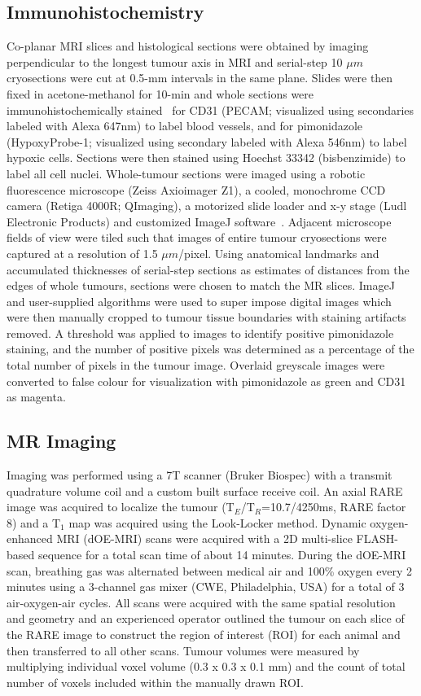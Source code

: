 \subsection{Immunohistochemistry}
Co-planar MRI slices and histological sections were obtained by imaging perpendicular to the longest tumour axis in MRI and serial-step 10 $\mu m$ cryosections were cut at 0.5-mm intervals in the same plane.
Slides were then fixed in acetone-methanol for 10-min and whole sections were immunohistochemically stained~\cite{Kalra:2017is} for CD31 (PECAM; visualized using secondaries labeled with Alexa 647nm) to label blood vessels, and for pimonidazole (HypoxyProbe-1; visualized using secondary labeled with Alexa 546nm) to label hypoxic cells. Sections were then stained using Hoechst 33342 (bisbenzimide) to label all cell nuclei.
Whole-tumour sections were imaged using a robotic fluorescence microscope (Zeiss Axioimager Z1), a cooled, monochrome CCD camera (Retiga 4000R; QImaging), a motorized slide loader and x-y stage (Ludl Electronic Products) and customized ImageJ software~\cite{Collins:2007jr}. 
Adjacent microscope fields of view were tiled such that images of entire tumour cryosections were captured at a resolution of 1.5 $\mu m$/pixel. 
Using anatomical landmarks and accumulated thicknesses of serial-step sections as estimates of distances from the edges of whole tumours, sections were chosen to match the MR slices. 
ImageJ and user-supplied algorithms were used to super impose digital images which were then manually cropped to tumour tissue boundaries with staining artifacts removed. 
A threshold was applied to images to identify positive pimonidazole staining, and the number of positive pixels was determined as a percentage of the total number of pixels in the tumour image. 
Overlaid greyscale images were converted to false colour for visualization with pimonidazole as green and CD31 as magenta.

\subsection{MR Imaging}
Imaging was performed using a 7T scanner (Bruker Biospec) with a transmit quadrature volume coil and a custom built surface receive coil. 
An axial RARE image was acquired to localize the tumour (T$_E$/T$_R$=10.7/4250ms, RARE factor 8) and a T$_1$ map was acquired using the Look-Locker method.
Dynamic oxygen-enhanced MRI (\ac{dOE-MRI}) scans were acquired with a 2D multi-slice FLASH-based sequence for a total scan time of about 14 minutes.
During the \ac{dOE-MRI} scan, breathing gas was alternated between medical air and 100\% oxygen every 2 minutes using a 3-channel gas mixer (CWE, Philadelphia, USA) for a total of 3 air-oxygen-air cycles.
All scans were acquired with the same spatial resolution and geometry and an experienced operator outlined the tumour on each slice of the RARE image to construct the region of interest (\acs{ROI}) for each animal and then transferred to all other scans.
Tumour volumes were measured by multiplying individual voxel volume (0.3 x 0.3 x 0.1 mm) and the count of total number of voxels included within the manually drawn \acs{ROI}.

